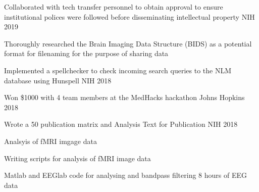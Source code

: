 

\begin{cvitems}
\item 
    {Collaborated with tech transfer personnel to obtain approval to ensure institutional polices were followed before disseminating intellectual property} %
    {NIH} %
    {2019} %
    
\item
    {Thoroughly researched the Brain Imaging Data Structure (BIDS) as a potential format for filenaming for the purpose of sharing data}

\item
    {Implemented a spellchecker to check incoming search queries to the NLM database using Hunspell} %
    {NIH} %
    {2018} %
\item
    {Won \$1000 with 4 team members at the MedHacks hackathon} %
    {Johns Hopkins} %
    {2018} %


  \item
    {Wrote a 50 publication matrix and Analysis Text for Publication} %
    {NIH} %
    {2018} %

  \item
    {Analsyis of fMRI imgage data}
  \item
    {Writing scripts for analysis of fMRI image data}
  \item
  {Matlab and EEGlab code for analysing and bandpass filtering 8 hours of EEG data}
\end{cvitems}
